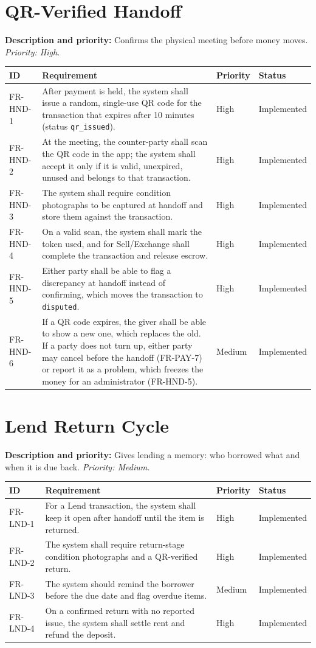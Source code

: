 \documentclass[11pt,a4paper]{scrreprt}
\newenvironment{reqtable}{%
  \small
  \begin{longtable}{>{\raggedright\arraybackslash\ttfamily\footnotesize}p{2.05cm} L{8.85cm} L{1.45cm} L{2.05cm}}
  \toprule
  \normalfont\normalsize\textbf{ID} & \textbf{Requirement} & \textbf{Priority} & \textbf{Status}\\
  \midrule\endhead
  \bottomrule\endfoot
}{\end{longtable}}
\newcommand{\impl}{Implemented}
\begin{document}
\section{QR-Verified Handoff}
\textbf{Description and priority:} Confirms the physical meeting before money
moves. \emph{Priority: High.}

\begin{reqtable}
FR-HND-1 & After payment is held, the system shall issue a random, single-use QR code for the transaction that expires after 10 minutes (status \texttt{qr_issued}). & High & \impl\\
FR-HND-2 & At the meeting, the counter-party shall scan the QR code in the app; the system shall accept it only if it is valid, unexpired, unused and belongs to that transaction. & High & \impl\\
FR-HND-3 & The system shall require condition photographs to be captured at handoff and store them against the transaction. & High & \impl\\
FR-HND-4 & On a valid scan, the system shall mark the token used, and for Sell/Exchange shall complete the transaction and release escrow. & High & \impl\\
FR-HND-5 & Either party shall be able to flag a discrepancy at handoff instead of confirming, which moves the transaction to \texttt{disputed}. & High & \impl\\
FR-HND-6 & If a QR code expires, the giver shall be able to show a new one, which replaces the old. If a party does not turn up, either party may cancel before the handoff (FR-PAY-7) or report it as a problem, which freezes the money for an administrator (FR-HND-5). & Medium & \impl\\
\end{reqtable}

\section{Lend Return Cycle}
\textbf{Description and priority:} Gives lending a memory: who borrowed
what and when it is due back. \emph{Priority: Medium.}

\begin{reqtable}
FR-LND-1 & For a Lend transaction, the system shall keep it open after handoff until the item is returned. & High & \impl\\
FR-LND-2 & The system shall require return-stage condition photographs and a QR-verified return. & High & \impl\\
FR-LND-3 & The system should remind the borrower before the due date and flag overdue items. & Medium & \impl\\
FR-LND-4 & On a confirmed return with no reported issue, the system shall settle rent and refund the deposit. & High & \impl\\
\end{reqtable}
\end{document}
